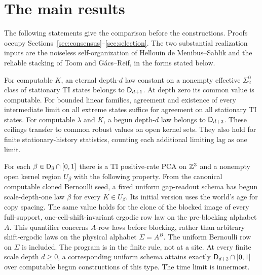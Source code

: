 \section{The main results}\label{sec:results}
The following statements give the comparison before the constructions.
Proofs occupy Sections~\ref{sec:consensus}--\ref{sec:selection}.
The two substantial realization inputs are the noiseless
self-organization of Hellouin de Menibus--Sablik and the reliable
stacking of Toom and G\'acs--Reif, in the forms stated below.

\begin{theorem}\label{thm:ceilings}
For computable $K$, an eternal depth-$d$ law constant on a nonempty
effective $\Sigma^0_2$ class of stationary TI states belongs to
$\mathsf D_{d+1}$. At depth zero its common value is computable.
For bounded linear families, agreement and existence of every
intermediate limit on all extreme states suffice for agreement
on all stationary TI states. For computable $\lambda$ and $K$,
a begun depth-$d$ law belongs to $\mathsf D_{d+2}$.
These ceilings transfer to common robust values on open kernel sets.
They also hold for finite stationary-history statistics, counting
each additional limiting lag as one limit.
\end{theorem}

\begin{theorem}
\label{thm:realization}
For each $\beta\in\mathsf D_3\cap[0,1]$ there is a TI positive-rate PCA
on $\mathbb Z^3$ and a nonempty open kernel region $U_\beta$ with the
following property. From the canonical computable cloned Bernoulli
seed, a fixed uniform gap-readout schema has begun scale-depth-one
law $\beta$ for every $K\in U_\beta$. Its initial version uses
the world's age for copy spacing. The same value holds for the clone of the blocked image of
every full-support, one-cell-shift-invariant ergodic row law on
the pre-blocking alphabet $A$. This quantifier concerns $A$-row
laws before blocking, rather than arbitrary shift-ergodic laws
on the physical alphabet $\Sigma=A^B$. The uniform Bernoulli
row on $\Sigma$ is included. The program is in the finite rule, not at a site.
At every finite scale depth $d\geq0$, a corresponding uniform
schema attains exactly $\mathsf D_{d+2}\cap[0,1]$ over computable begun
constructions of this type. The time limit is innermost.
\end{theorem}

